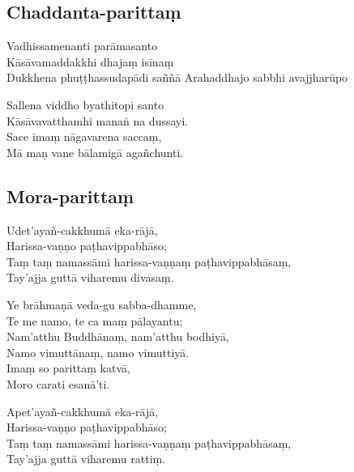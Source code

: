 \subsection{Chaddanta-parittaṃ}
\label{vadhissamenanti}



\begin{paritta}

Vadhissamenanti parāmasanto\\
Kāsāvamaddakkhi dhajaṃ isīnaṃ\\
Dukkhena phuṭṭhassudapādi saññā
Arahaddhajo sabbhi avajjharūpo

Sallena viddho byathitopi santo\\
Kāsāvavatthamhi manaṅ na dussayi.\\
Sace imaṃ nāgavarena saccaṃ,\\
Mā maṇ vane bālamigā agañchunti.

\end{paritta}

\subsection{Mora-parittaṃ}
\label{udetayan-cakkhuma}



Udet'ayañ-cakkhumā eka-rājā,\\
Harissa-vaṇṇo paṭhavippabhāso;\\
Taṃ taṃ namassāmi harissa-vaṇṇaṃ paṭhavippabhāsaṃ,\\
Tay'ajja guttā viharemu divasaṃ.

Ye brāhmaṇā veda-gu sabba-dhamme,\\
Te me namo, te ca maṃ pālayantu;\\
Nam'atthu Buddhānaṃ, nam'atthu bodhiyā,\\
Namo vimuttānaṃ, namo vimuttiyā.\\
Imaṃ so parittaṃ katvā,\\
Moro carati esanā'ti.


Apet'ayañ-cakkhumā eka-rājā,\\
Harissa-vaṇṇo paṭhavippabhāso;\\
Taṃ taṃ namassāmi harissa-vaṇṇaṃ paṭhavippabhāsaṃ,\\
Tay'ajja guttā viharemu rattiṃ.

